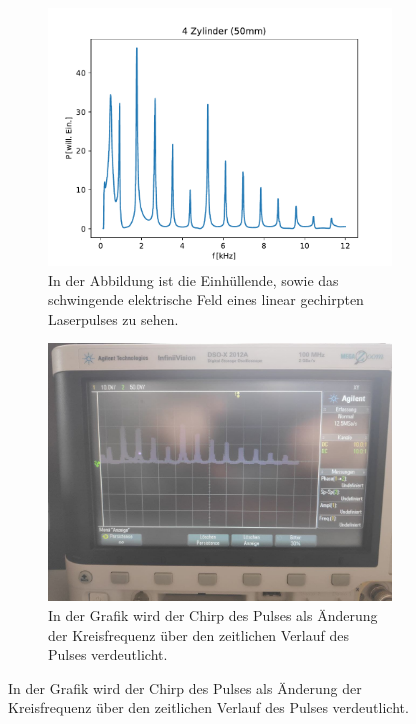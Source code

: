 \begin{figure}
            \centering
            \begin{subfigure}[b]{0.45\textwidth}
                \centering
                \includegraphics[scale=0.4]{./pictures/4_Zylinder_50mm.pdf}
                \caption{In der Abbildung ist die Einhüllende, sowie das schwingende elektrische Feld eines linear gechirpten Laserpulses zu sehen.}
                \label{fig:e_feld_chirp}
            \end{subfigure}
            \hfill
            \centering
            \begin{subfigure}[b]{0.45\textwidth}
                \centering
                \includegraphics[scale=0.13]{./pictures/4_Zylinder.jpg}
                \caption{In der Grafik wird der Chirp des Pulses als Änderung der Kreisfrequenz über den zeitlichen Verlauf des Pulses verdeutlicht.}
                \label{fig:chirp}
            \end{subfigure}


\end{figure}
